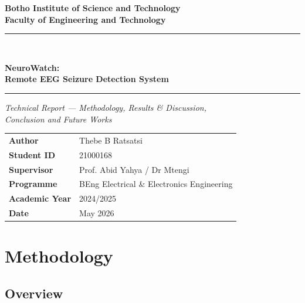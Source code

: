 \documentclass[12pt, a4paper]{report}
\begin{document}
\begin{titlepage}
  \centering
  \vspace*{1cm}
  {\Large\bfseries Botho Institute of Science and Technology\\[0.4em]
   Faculty of Engineering and Technology\par}
  \vspace{1.5cm}
  \rule{\linewidth}{0.5pt}\\[0.4em]
  {\huge\bfseries NeuroWatch:\\[0.3em]
   Remote EEG Seizure Detection System\par}
  \rule{\linewidth}{0.5pt}
  \vspace{1cm}
  {\large\itshape Technical Report --- Methodology, Results \& Discussion,\\
   Conclusion and Future Works\par}
  \vfill
  \begin{tabular}{ll}
    \textbf{Author}        & Thebe B Ratsatsi \\
    \textbf{Student ID}    & 21000168 \\
    \textbf{Supervisor}    & Prof. Abid Yahya / Dr Mtengi \\
    \textbf{Programme}     & BEng Electrical \& Electronics Engineering \\
    \textbf{Academic Year} & 2024/2025 \\
    \textbf{Date}          & May 2026 \\
  \end{tabular}
  \vspace{1.5cm}
\end{titlepage}

\tableofcontents
\listoffigures
\listoftables
\clearpage

\chapter{Methodology}

\section{Overview}
\end{document}
